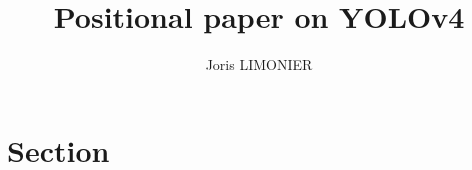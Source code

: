 \documentclass{article}
\title{Positional paper on YOLOv4}
\author{Joris LIMONIER}
\begin{document}
\maketitle


\section{Section}


\cite{bodla_soft-nms_2017}
\cite{cai_cascade_2018}
\cite{chao_hardnet_2019}
\cite{cao_hierarchical_2019}
\cite{chen_gridmask_2020}
\cite{chen_deeplab_2017}
\cite{chen_detnas_2019}
\cite{choi_gaussian_2019}
\cite{ustinova_learning_2016}
\cite{devries_improved_2017}



\end{document}
